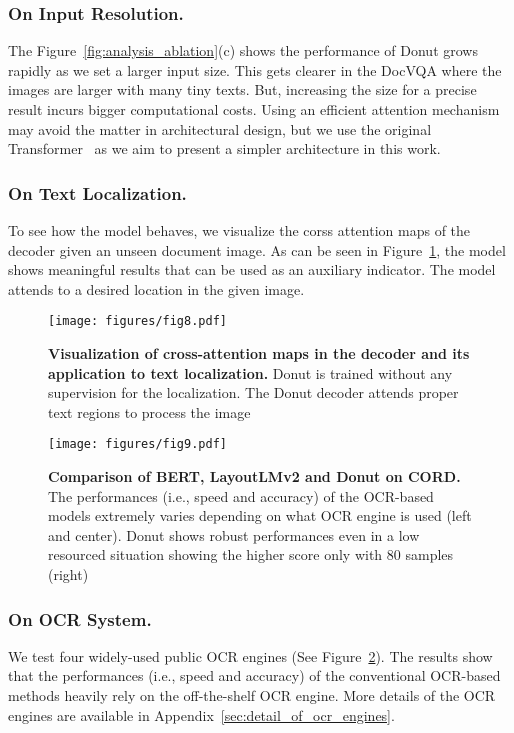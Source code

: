 \documentclass[runningheads]{llncs}
\newcommand\ours{{{\mbox{Donut}}}\xspace}
\begin{document}
\subsubsection{On Input Resolution.}
The Figure~\ref{fig:analysis_ablation}(c) shows the performance of \ours grows rapidly as we set a larger input size. This gets clearer in the DocVQA where the images are larger with many tiny texts. But, increasing the size for a precise result incurs bigger computational costs. Using an efficient attention mechanism~\cite{wang2020linformer} may avoid the matter in architectural design, but we use the original Transformer~\cite{vaswani2017transformer} as we aim to present a simpler architecture in this work.

\subsubsection{On Text Localization.}
To see how the model behaves, we visualize the corss attention maps of the decoder given an unseen document image. As can be seen in Figure~\ref{fig:detection}, the model shows meaningful results that can be used as an auxiliary indicator. The model attends to a desired location in the given image.

\begin{figure}[t]
    \centering
    \texttt{[image: figures/fig8.pdf]}
    \caption{{\bf Visualization of cross-attention maps in the decoder and its application to text localization.} \ours is trained without any supervision for the localization. The \ours decoder attends proper text regions to process the image}
    \label{fig:detection}
\end{figure}

\begin{figure}[!t]
    \centering
    \texttt{[image: figures/fig9.pdf]}
    \caption{\textbf{Comparison of BERT, LayoutLMv2 and \ours on CORD.} The performances (i.e., speed and accuracy) of the OCR-based models extremely varies depending on what OCR engine is used (left and center). \ours shows robust performances even in a low resourced situation showing the higher score only with 80 samples (right)}
    \label{fig:analysis_ablation_ocr_low_resource}
\end{figure}
\subsubsection{On OCR System.}
We test four widely-used public OCR engines (See Figure~\ref{fig:analysis_ablation_ocr_low_resource}). The results show that the performances (i.e., speed and accuracy) of the conventional OCR-based methods heavily rely on the off-the-shelf OCR engine.
More details of the OCR engines are available in Appendix~\ref{sec:detail_of_ocr_engines}. 
\end{document}
